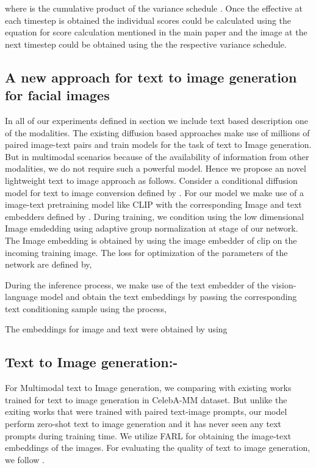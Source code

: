 \documentclass[10pt,twocolumn,letterpaper]{article}
\begin{document}
where  is the cumulative product of the variance schedule . Once the effective  at each timestep is obtained the individual scores could be calculated using the equation for score calculation mentioned in the main paper and the image at the next timestep could be obtained using the the respective variance schedule.



\subsection{A new approach for text to image generation for facial images}
In all of our experiments defined in section we include text based description one of the modalities. The existing diffusion based approaches make use of millions of paired image-text pairs and train models for the task of text to Image generation. But in multimodal scenarios because of the availability of information from other modalities, we do not require such a powerful model. Hence we propose an novel lightweight text to image approach as follows. Consider a conditional diffusion model for text to image conversion defined by . For our model we make use of a image-text pretraining model like CLIP with the corresponding Image and text embedders  defined by . During training, we condition using the low dimensional Image emdedding using adaptive  group normalization at stage of our network. The Image embedding is obtained by using the image embedder of clip on the incoming training image. The loss for optimization of the parameters  of the network are defined by,


During the inference process, we make use of the text embedder of the vision-language model and obtain the text embeddings by passing the corresponding text conditioning   sample using the process,


The embeddings for image and text were obtained by using \cite{zheng2021farl}



\subsection{Text to Image generation:-}

For Multimodal text to Image generation, we comparing with existing works trained for text to image generation in CelebA-MM dataset. But unlike the exiting works that were trained with paired text-image prompts, our model perform zero-shot text to image generation and it has never seen any text prompts during training time. We utilize FARL\cite{zheng2021farl} for obtaining the image-text embeddings of the images. For evaluating the quality of text to image generation, we follow \cite{xia2021tedigan}. 
\end{document}
